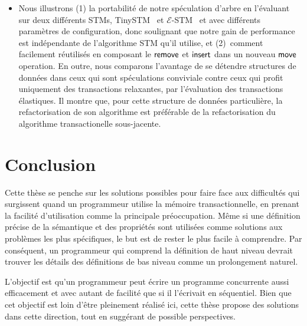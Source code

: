 \begin{itemize}
\item Nous illustrons (1) la portabilité de notre spéculation d'arbre en l'évaluant sur deux différents STMs, TinySTM~\cite{FFR08} et $\mathcal{E}$-STM~\cite{FGG09}
et avec différents paramètres de configuration, donc soulignant que notre gain de performance est indépendante de l'algorithme STM qu'il utilise,
et (2)~comment facilement réutilisés en composant le $\lit{remove}$ et $\lit{insert}$ dans un nouveau $\lit{move}$ operation.
En outre, nous comparons l'avantage de se détendre structures de données dans ceux qui sont spéculations conviviale contre ceux qui profit uniquement des transactions relaxantes, par l'évaluation des transactions élastiques.
Il montre que, pour cette structure de données particulière, la refactorisation de son algorithme est préférable de la refactorisation du algorithme transactionelle sous-jacente.



\end{itemize}


\section*{Conclusion}

Cette thèse se penche sur les solutions possibles pour faire face aux difficultés qui surgissent quand un programmeur utilise la mémoire transactionnelle, en prenant la facilité d'utilisation comme la principale préoccupation.
Même si une définition précise de la sémantique et des propriétés sont utilisées comme solutions aux problèmes les plus spécifiques, le but est de rester le plus facile à comprendre.
Par conséquent, un programmeur qui comprend la définition de haut niveau devrait trouver les détails des définitions de bas niveau comme un prolongement naturel.


L'objectif est qu'un programmeur peut écrire un programme concurrente aussi efficacement et avec autant de facilité que si il l'écrivait en séquentiel.
Bien que cet objectif est loin d'être pleinement réalisé ici, cette thèse propose des solutions dans cette direction, tout en suggérant de possible perspectives.




